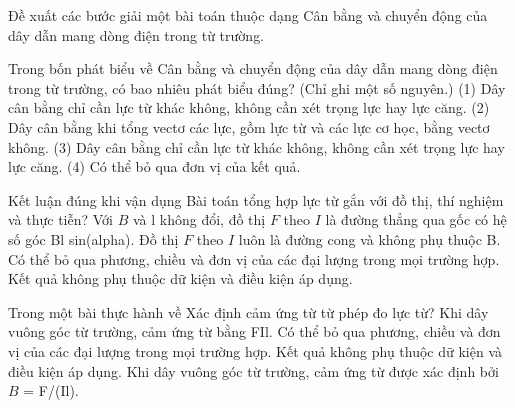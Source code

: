 \begin{bt}
Đề xuất các bước giải một bài toán thuộc dạng Cân bằng và chuyển động của dây dẫn mang dòng điện trong từ trường.
\end{bt}

\begin{ex}
Trong bốn phát biểu về Cân bằng và chuyển động của dây dẫn mang dòng điện trong từ trường, có bao nhiêu phát biểu đúng? (Chỉ ghi một số nguyên.) (1) Dây cân bằng chỉ cần lực từ khác không, không cần xét trọng lực hay lực căng. (2) Dây cân bằng khi tổng vectơ các lực, gồm lực từ và các lực cơ học, bằng vectơ không. (3) Dây cân bằng chỉ cần lực từ khác không, không cần xét trọng lực hay lực căng. (4) Có thể bỏ qua đơn vị của kết quả.
\end{ex}

\begin{ex}
Kết luận đúng khi vận dụng Bài toán tổng hợp lực từ gắn với đồ thị, thí nghiệm và thực tiễn?
\choice
{\True Với $B$ và l không đổi, đồ thị $F$ theo $I$ là đường thẳng qua gốc có hệ số góc Bl sin(alpha).}
{Đồ thị $F$ theo $I$ luôn là đường cong và không phụ thuộc B.}
{Có thể bỏ qua phương, chiều và đơn vị của các đại lượng trong mọi trường hợp.}
{Kết quả không phụ thuộc dữ kiện và điều kiện áp dụng.}
\end{ex}

\begin{ex}
Trong một bài thực hành về Xác định cảm ứng từ từ phép đo lực từ?
\choice
{Khi dây vuông góc từ trường, cảm ứng từ bằng FIl.}
{Có thể bỏ qua phương, chiều và đơn vị của các đại lượng trong mọi trường hợp.}
{Kết quả không phụ thuộc dữ kiện và điều kiện áp dụng.}
{\True Khi dây vuông góc từ trường, cảm ứng từ được xác định bởi $B$ = F/(Il).}
\end{ex}

